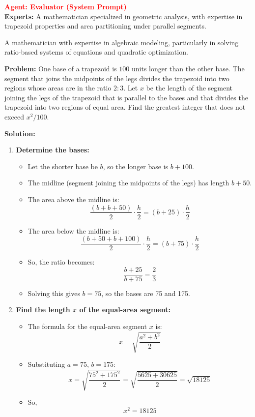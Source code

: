 \begin{tcolorbox}[
  title=Multiagent Collaborative Reasoning Trace Data Sample,
  breakable,
  colback=white,
  colframe=black
]
\textcolor{red}{\textbf{Agent: Evaluator (System Prompt)}} \\
\textbf{Experts:} A mathematician specialized in geometric analysis, with expertise in trapezoid properties and area partitioning under parallel segments.

A mathematician with expertise in algebraic modeling, particularly in solving ratio-based systems of equations and quadratic optimization.

\textbf{Problem:} One base of a trapezoid is $100$ units longer than the other base. The segment that joins the midpoints of the legs divides the trapezoid into two regions whose areas are in the ratio $2:3$. Let $x$ be the length of the segment joining the legs of the trapezoid that is parallel to the bases and that divides the trapezoid into two regions of equal area. Find the greatest integer that does not exceed $x^2/100$.

\textbf{Solution:}
\begin{enumerate}
  \item \textbf{Determine the bases:}
  \begin{itemize}
    \item Let the shorter base be \( b \), so the longer base is \( b + 100 \).
    \item The midline (segment joining the midpoints of the legs) has length \( b + 50 \).
    \item The area above the midline is:
    \[
    \frac{(b + b + 50)}{2} \cdot \frac{h}{2} = (b + 25)\cdot \frac{h}{2}
    \]
    \item The area below the midline is:
    \[
    \frac{(b + 50 + b + 100)}{2} \cdot \frac{h}{2} = (b + 75)\cdot \frac{h}{2}
    \]
    \item So, the ratio becomes:
    \[
    \frac{b + 25}{b + 75} = \frac{2}{3}
    \]
    \item Solving this gives \( b = 75 \), so the bases are 75 and 175.
  \end{itemize}

  \item \textbf{Find the length \( x \) of the equal-area segment:}
  \begin{itemize}
    \item The formula for the equal-area segment \( x \) is:
    \[
    x = \sqrt{\frac{a^2 + b^2}{2}}
    \]
    \item Substituting \( a = 75 \), \( b = 175 \):
    \[
    x = \sqrt{\frac{75^2 + 175^2}{2}} = \sqrt{\frac{5625 + 30625}{2}} = \sqrt{18125}
    \]
    \item So,
    \[
    x^2 = 18125
    \]
  \end{itemize}


\end{enumerate}
\end{tcolorbox}
